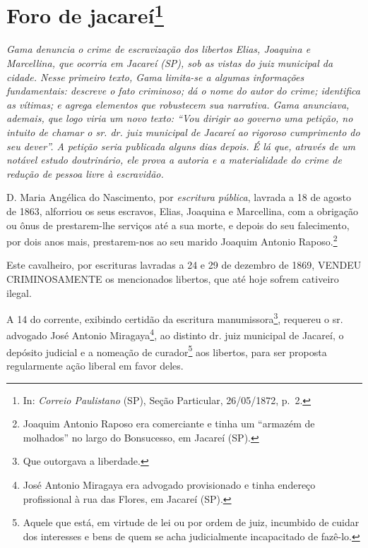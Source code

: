 {\chapter{Foro de jacareí\footnote{ In: \emph{Correio Paulistano} (SP), Seção Particular,
  26/05/1872, p.~2.}} %

\begin{didascalia}
\emph{Gama denuncia o crime de escravização dos libertos Elias, Joaquina
e Marcellina, que ocorria em Jacareí (SP), sob as vistas do juiz
municipal da cidade. Nesse primeiro texto, Gama limita-se a algumas
informações fundamentais: descreve o fato criminoso; dá o nome do autor
do crime; identifica as vítimas; e agrega elementos que robustecem sua
narrativa. Gama anunciava, ademais, que logo viria um novo texto: ``Vou
dirigir ao governo uma petição, no intuito de chamar o sr. dr. juiz
municipal de Jacareí ao rigoroso cumprimento do seu dever''. A petição
seria publicada alguns dias depois. É lá que, através de um notável
estudo doutrinário, ele prova a autoria e a materialidade do crime de
redução de pessoa livre à escravidão.}
\end{didascalia}

\asterisc{}

D. Maria Angélica do Nascimento, por \emph{escritura pública}, lavrada a
18 de agosto de 1863, alforriou os seus escravos, Elias, Joaquina e
Marcellina, com a obrigação ou ônus de prestarem-lhe serviços até a sua
morte, e depois do seu falecimento, por dois anos mais, prestarem-nos ao
seu marido Joaquim Antonio Raposo.\footnote{ Joaquim Antonio Raposo era
  comerciante e tinha um ``armazém de molhados'' no largo do Bonsucesso,
  em Jacareí (SP).}

Este cavalheiro, por escrituras lavradas a 24 e 29 de dezembro de 1869,
VENDEU CRIMINOSAMENTE os mencionados libertos, que até hoje sofrem
cativeiro ilegal.

A 14 do corrente, exibindo certidão da escritura manumissora\footnote{
  Que outorgava a liberdade.}, requereu o sr. advogado José Antonio
Miragaya\footnote{ José Antonio Miragaya era advogado provisionado e
  tinha endereço profissional à rua das Flores, em Jacareí (SP).}, ao
distinto dr. juiz municipal de Jacareí, o depósito judicial e a nomeação
de curador\footnote{ Aquele que está, em virtude de lei ou por ordem de
  juiz, incumbido de cuidar dos interesses e bens de quem se acha
  judicialmente incapacitado de fazê-lo.} aos libertos, para ser
proposta regularmente ação liberal em favor deles.

}
